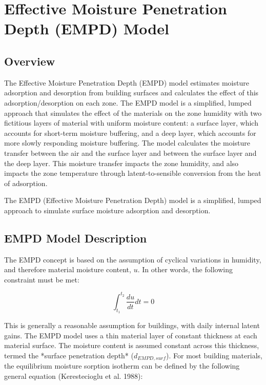 \section{Effective Moisture Penetration Depth (EMPD) Model}\label{effective-moisture-penetration-depth-empd-model}

\subsection{Overview}\label{overview-014}

The Effective Moisture Penetration Depth (EMPD) model estimates moisture adsorption and desorption from building surfaces and calculates the effect of this adsorption/desorption on each zone. The EMPD model is a simplified, lumped approach that simulates the effect of the materials on the zone humidity with two fictitious layers of material with uniform moisture content: a surface layer, which accounts for short-term moisture buffering, and a deep layer, which accounts for more slowly responding moisture buffering. The model calculates the moisture transfer between the air and the surface layer and between the surface layer and the deep layer. This moisture transfer impacts the zone humidity, and also impacts the zone temperature through latent-to-sensible conversion from the heat of adsorption.

The EMPD (Effective Moisture Penetration Depth) model is a simplified, lumped approach to simulate surface moisture adsorption and desorption.

\subsection{EMPD Model Description}\label{empd-model-description}

The EMPD concept is based on the assumption of cyclical variations in humidity, and therefore material moisture content, $u$. In other words, the following constraint must be met:

\begin{equation}
\int_{{t_1}}^{{t_2}} {\frac{{du}}{{dt }}} dt  = 0
\end{equation}

This is generally a reasonable assumption for buildings, with daily internal latent gains. The EMPD model uses a thin material layer of constant thickness at each material surface. The moisture content is assumed constant across this thickness, termed the *surface penetration depth* ($d_{EMPD,surf}$). For most building materials, the equilibrium moisture sorption isotherm can be defined by the following general equation (Kerestecioglu et al. 1988):

